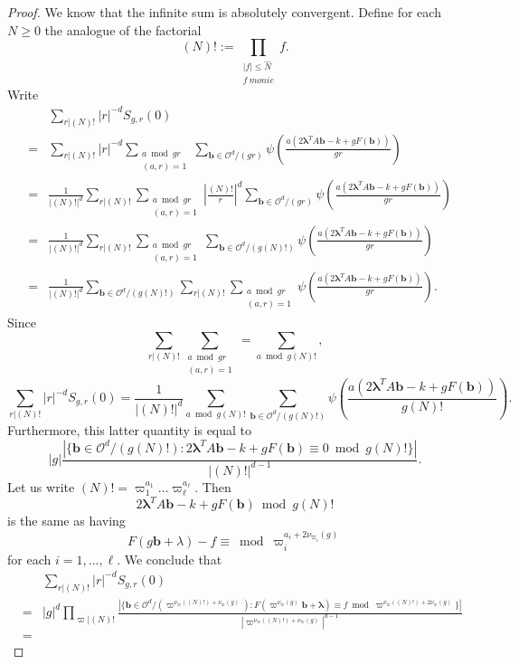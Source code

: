 \documentclass[11pt]{amsart}
\theoremstyle{plain}
\theoremstyle{plain}
\renewcommand{\vec}[1]{\mathbf{#1}}
\theoremstyle{remark}
\theoremstyle{definition}
\renewcommand{\hat}{\widehat}
\begin{document}
\begin{proof}
We know that the infinite sum is absolutely convergent. Define for each $N\geq 0$ the analogue of the factorial
\[(N)!:=\prod_{\substack{|f|\leq\hat{N}\\ f\ monic}}f.\]
Write
\begin{eqnarray*}
&&\sum_{r|(N)!}|r|^{-d}S_{g,r}(0)\\&=&\sum_{r|(N)!}|r|^{-d}\sum_{\substack{a\bmod gr\\ (a,r)=1}}\sum_{\vec{b}\in\mathcal{O}^d/(gr)}\psi\left(\frac{a(2\boldsymbol{\lambda}^TA\vec{b}-k+gF(\vec{b}))}{gr}\right)\\&=&\frac{1}{|(N)!|^d}\sum_{r|(N)!}\sum_{\substack{a\bmod gr\\ (a,r)=1}}\left|\frac{(N)!}{r}\right|^d\sum_{\vec{b}\in\mathcal{O}^d/(gr)}\psi\left(\frac{a(2\boldsymbol{\lambda}^TA\vec{b}-k+gF(\vec{b}))}{gr}\right)\\&=&\frac{1}{|(N)!|^d}\sum_{r|(N)!}\sum_{\substack{a\bmod gr\\ (a,r)=1}}\sum_{\vec{b}\in\mathcal{O}^d/(g(N)!)}\psi\left(\frac{a(2\boldsymbol{\lambda}^TA\vec{b}-k+gF(\vec{b}))}{gr}\right)\\&=& \frac{1}{|(N)!|^d}\sum_{\vec{b}\in\mathcal{O}^d/(g(N)!)}\sum_{r|(N)!}\sum_{\substack{a\bmod gr\\ (a,r)=1}}\psi\left(\frac{a(2\boldsymbol{\lambda}^TA\vec{b}-k+gF(\vec{b}))}{gr}\right).
\end{eqnarray*}
Since
\[\sum_{r|(N)!}\sum_{\substack{a\bmod gr\\ (a,r)=1}}=\sum_{a\bmod g(N)!},\]
\[\sum_{r|(N)!}|r|^{-d}S_{g,r}(0)=\frac{1}{|(N)!|^d}\sum_{a\bmod g(N)!}\sum_{\vec{b}\in\mathcal{O}^d/(g(N)!)}\psi\left(\frac{a(2\boldsymbol{\lambda}^TA\vec{b}-k+gF(\vec{b}))}{g(N)!}\right).\]
Furthermore, this latter quantity is equal to
\[|g|\frac{\left|\{\vec{b}\in\mathcal{O}^d/(g(N)!):2\boldsymbol{\lambda}^TA\vec{b}-k+gF(\vec{b})\equiv 0\bmod g(N)!\}\right|}{|(N)!|^{d-1}}.\]
Let us write $(N)!=\varpi_1^{a_1}\hdots\varpi_{\ell}^{a_{\ell}}$. Then 
\[2\boldsymbol{\lambda}^TA\vec{b}-k+gF(\vec{b})\bmod g(N)!\]
is the same as having
\[F(g\vec{b}+\lambda)-f\equiv \bmod \varpi_i^{a_i+2\nu_{\varpi_i}(g)}\]
for each $i=1,\hdots,\ell$. We conclude that
\begin{eqnarray*}&&\sum_{r|(N)!}|r|^{-d}S_{g,r}(0)\\&=&|g|^d\prod_{\varpi|(N)!}\frac{\left|\{\vec{b}\in\mathcal{O}^d/(\varpi^{\nu_{\varpi}((N)!)+\nu_{\varpi}(g)}):F(\varpi^{\nu_{\varpi}(g)}\vec{b}+\boldsymbol{\lambda})\equiv f\bmod \varpi^{\nu_{\varpi}((N)!)+2\nu_{\varpi}(g)}\}\right|}{|\varpi^{\nu_{\varpi}((N)!)+\nu_{\varpi}(g)}|^{d-1}}\\&=&

\end{eqnarray*}
\end{proof}
\end{document}
